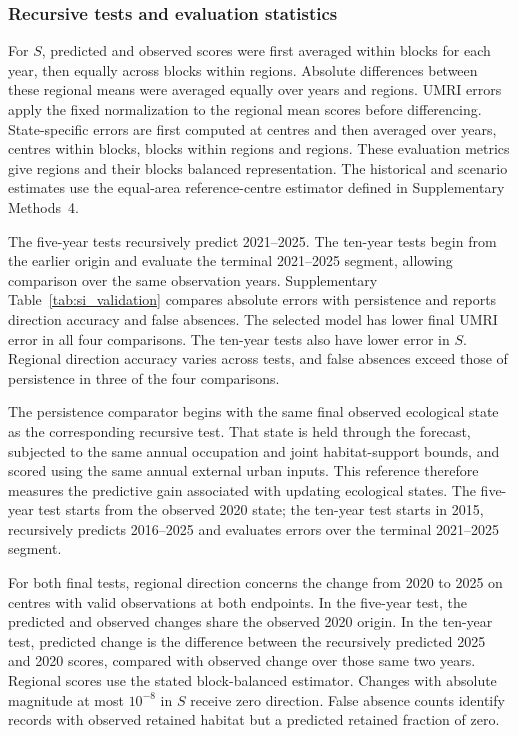 \subsubsection{Recursive tests and evaluation statistics}

For $S$, predicted and observed scores were first averaged within blocks for each year, then equally across blocks within regions. Absolute differences between these regional means were averaged equally over years and regions. UMRI errors apply the fixed normalization to the regional mean scores before differencing. State-specific errors are first computed at centres and then averaged over years, centres within blocks, blocks within regions and regions. These evaluation metrics give regions and their blocks balanced representation. The historical and scenario estimates use the equal-area reference-centre estimator defined in Supplementary Methods~4.

The five-year tests recursively predict 2021--2025. The ten-year tests begin from the earlier origin and evaluate the terminal 2021--2025 segment, allowing comparison over the same observation years. Supplementary Table~\ref{tab:si_validation} compares absolute errors with persistence and reports direction accuracy and false absences. The selected model has lower final UMRI error in all four comparisons. The ten-year tests also have lower error in $S$. Regional direction accuracy varies across tests, and false absences exceed those of persistence in three of the four comparisons.

The persistence comparator begins with the same final observed ecological state as the corresponding recursive test. That state is held through the forecast, subjected to the same annual occupation and joint habitat-support bounds, and scored using the same annual external urban inputs. This reference therefore measures the predictive gain associated with updating ecological states. The five-year test starts from the observed 2020 state; the ten-year test starts in 2015, recursively predicts 2016--2025 and evaluates errors over the terminal 2021--2025 segment.

For both final tests, regional direction concerns the change from 2020 to 2025 on centres with valid observations at both endpoints. In the five-year test, the predicted and observed changes share the observed 2020 origin. In the ten-year test, predicted change is the difference between the recursively predicted 2025 and 2020 scores, compared with observed change over those same two years. Regional scores use the stated block-balanced estimator. Changes with absolute magnitude at most $10^{-8}$ in $S$ receive zero direction. False absence counts identify records with observed retained habitat but a predicted retained fraction of zero.

